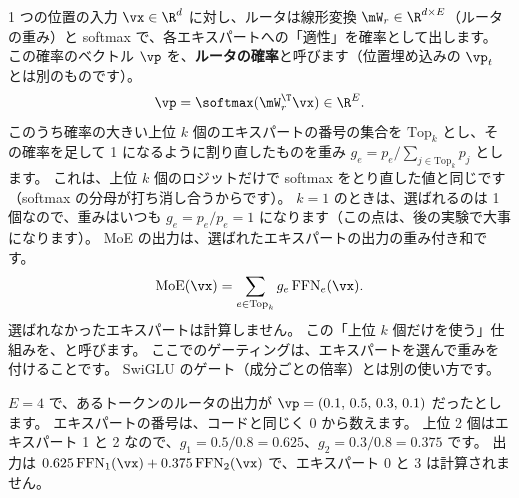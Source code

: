 1 つの位置の入力 $\vx\in\R^d$ に対し、ルータは線形変換 $\mW_r\in\R^{d\times E}$（ルータの重み）と softmax で、各エキスパートへの「適性」を確率として出します。
この確率のベクトル $\vp$ を、\textbf{ルータの確率}と呼びます（位置埋め込みの $\vp_t$ とは別のものです）。
\begin{equation}
\vp=\softmax(\mW_r^\T\vx)\in\R^E .
\label{eq:ma-router}
\end{equation}
このうち確率の大きい上位 $k$ 個のエキスパートの番号の集合を $\mathrm{Top}_k$ とし、その確率を足して 1 になるように割り直したものを重み $g_e=p_e/\sum_{j\in\mathrm{Top}_k}p_j$ とします。
これは、上位 $k$ 個のロジットだけで softmax をとり直した値と同じです（softmax の分母が打ち消し合うからです）。
$k=1$ のときは、選ばれるのは 1 個なので、重みはいつも $g_e=p_e/p_e=1$ になります（この点は、後の実験で大事になります）。
MoE の出力は、選ばれたエキスパートの出力の重み付き和です。
\begin{equation}
\mathrm{MoE}(\vx)=\sum_{e\in\mathrm{Top}_k} g_e\,\mathrm{FFN}_e(\vx).
\label{eq:ma-moe}
\end{equation}
選ばれなかったエキスパートは計算しません。
この「上位 $k$ 個だけを使う」仕組みを、と呼びます\cite{shazeer2017outrageously}。
ここでのゲーティングは、エキスパートを選んで重みを付けることです。
SwiGLU のゲート（成分ごとの倍率）とは別の使い方です。

\begin{example}
$E=4$ で、あるトークンのルータの出力が $\vp=(0.1,\,0.5,\,0.3,\,0.1)$ だったとします。
エキスパートの番号は、コードと同じく 0 から数えます。
上位 2 個はエキスパート 1 と 2 なので、$g_1=0.5/0.8=0.625$、$g_2=0.3/0.8=0.375$ です。
出力は $0.625\,\mathrm{FFN}_1(\vx)+0.375\,\mathrm{FFN}_2(\vx)$ で、エキスパート 0 と 3 は計算されません。
\end{example}

